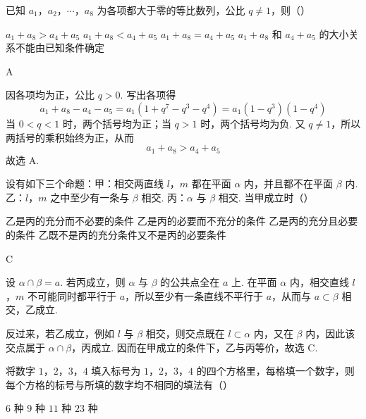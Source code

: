 \begin{problem}
已知 \(a_1\)，\(a_2\)，\(\cdots\)，\(a_8\) 为各项都大于零的等比数列，公比 \(q\neq 1\)，则（\quad）

\choices
    {\(a_1+a_8>a_4+a_5\)}
    {\(a_1+a_8<a_4+a_5\)}
    {\(a_1+a_8=a_4+a_5\)}
    {\(a_1+a_8\) 和 \(a_4+a_5\) 的大小关系不能由已知条件确定}
\end{problem}

\begin{answer}
A
\end{answer}

\begin{solution}
因各项均为正，公比 \(q>0\). 写出各项得
\[
a_1+a_8-a_4-a_5
=a_1(1+q^7-q^3-q^4)
=a_1(1-q^3)(1-q^4)
\]
当 \(0<q<1\) 时，两个括号均为正；当 \(q>1\) 时，两个括号均为负. 又 \(q\neq1\)，所以两括号的乘积始终为正，从而
\[
a_1+a_8>a_4+a_5
\]
故选 A.
\end{solution}

\begin{problem}
设有如下三个命题：甲：相交两直线 \(l\)，\(m\) 都在平面 \(\alpha\) 内，并且都不在平面 \(\beta\) 内. 乙：\(l\)，\(m\) 之中至少有一条与 \(\beta\) 相交. 丙：\(\alpha\) 与 \(\beta\) 相交. 当甲成立时（\quad）

\choices
    {乙是丙的充分而不必要的条件}
    {乙是丙的必要而不充分的条件}
    {乙是丙的充分且必要的条件}
    {乙既不是丙的充分条件又不是丙的必要条件}
\end{problem}

\begin{answer}
C
\end{answer}

\begin{solution}
设 \(\alpha\cap\beta=a\). 若丙成立，则 \(\alpha\) 与 \(\beta\) 的公共点全在 \(a\) 上. 在平面 \(\alpha\) 内，相交直线 \(l\)，\(m\) 不可能同时都平行于 \(a\)，所以至少有一条直线不平行于 \(a\)，从而与 \(a\subset\beta\) 相交，乙成立.

反过来，若乙成立，例如 \(l\) 与 \(\beta\) 相交，则交点既在 \(l\subset\alpha\) 内，又在 \(\beta\) 内，因此该交点属于 \(\alpha\cap\beta\)，丙成立. 因而在甲成立的条件下，乙与丙等价，故选 C.
\end{solution}

\begin{problem}
将数字 \(1\)，\(2\)，\(3\)，\(4\) 填入标号为 \(1\)，\(2\)，\(3\)，\(4\) 的四个方格里，每格填一个数字，则每个方格的标号与所填的数字均不相同的填法有（\quad）

\choices
    {\(6\) 种}
    {\(9\) 种}
    {\(11\) 种}
    {\(23\) 种}
\end{problem}

